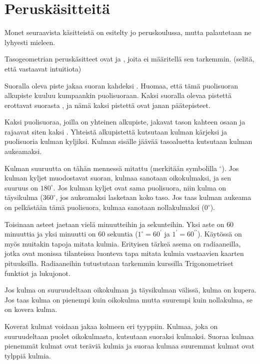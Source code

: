 \section*{Peruskäsitteitä}

Monet seuraavista käsitteistä on esitelty jo peruskoulussa, mutta palautetaan ne lyhyesti
mieleen.

Tasogeometrian peruskäsitteet ovat  ja , joita ei
määritellä sen tarkemmin. (selitä, että vastaavat intuitiota)

Suoralla oleva piste jakaa suoran kahdeksi . Huomaa, että tämä puolisuoran
alkupiste kuuluu kumpaankin puolisuoraan. Kaksi suoralla olevaa pistettä erottavat suorasta
, ja nämä kaksi pistettä ovat janan päätepisteet.

Kaksi puolisuoraa, joilla on yhteinen alkupiste, jakavat tason kahteen osaan ja rajaavat siten kaksi . Yhteistä alkupistettä
kutsutaan kulman kärjeksi ja puolisuoria kulman kyljiksi. Kulman sisälle jäävää tasoaluetta
kutsutaan kulman aukeamaksi.

Kulman suuruutta on tähän mennessä mitattu  (merkitään symbolilla $^{\circ}$). Jos kulman kyljet muodostavat suoran,
kulmaa sanotaan oikokulmaksi, ja sen suuruus on $180^{\circ}$.
Jos kulman kyljet ovat sama puolisuora, niin kulma on täysikulma ($360^{\circ}$, jos aukeamaksi lasketaan
koko taso. Jos taas kulman aukeama on pelkästään tämä puolisuora, kulmaa sanotaan
nollakulmaksi ($0^{\circ}$).

Toisinaan asteet jaetaan vielä minuutteihin ja sekunteihin. Yksi aste on $60$ minuuttia ja
yksi minuutti on $60$ sekuntia ($1^{\circ} = 60^{\prime}$ ja $1^{\prime} = 
60^{\prime \prime}$).
Käytössä on myös muitakin tapoja mitata kulmia. Erityisen tärkeä asema on radiaaneilla, jotka
ovat monissa tilanteissa luonteva tapa mitata kulmia vastaavien kaarten pituuksilla. Radiaaneihin
tutustutaan tarkemmin kurssilla Trigonometriset funktiot ja lukujonot.


Jos kulma on
suuruudeltaan oikokulman ja täysikulman välissä, kulma on kupera. Jos taas kulma on pienempi
kuin oikokulma mutta suurempi kuin nollakulma, se on kovera kulma.

Koverat kulmat voidaan jakaa kolmeen eri tyyppiin. Kulmaa, joka on suuruudeltaan puolet
oikokulmasta, kutsutaan suoraksi kulmaksi. Suoraa kulmaa pienemmät kulmat ovat teräviä
kulmia ja suoraa kulmaa suuremmat kulmat ovat tylppiä kulmia.

